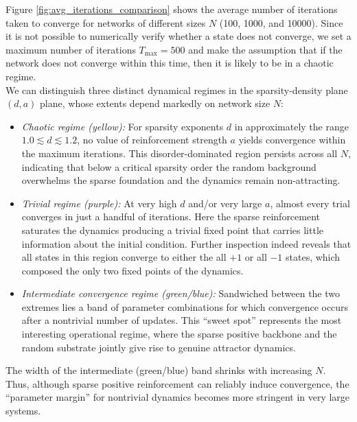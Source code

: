 \documentclass[a4paper,12pt]{report}
\begin{document}
Figure \ref{fig:avg_iterations_comparison} shows the average number of iterations
taken to converge for networks of different sizes \(N\) (100, 1000, and 10000).
Since it is not possible to numerically verify whether a state does not
converge, we set a maximum number of iterations \(T_{\max} = 500\) and 
make the assumption that if the network does not converge within this time,
then it is likely to be in a chaotic regime. \\
We can distinguish three distinct dynamical regimes in the sparsity-density
plane \((d,a)\) plane, whose extents depend markedly on network size \(N\):

\begin{itemize}
  \item \emph{Chaotic regime (yellow):}  
    For sparsity exponents \(d\) in approximately the range 
    \(1.0 \lesssim d \lesssim 1.2\), no value of reinforcement 
    strength \(a\) yields convergence within the maximum iterations.  
    This disorder-dominated region persists across all \(N\), 
    indicating that below a critical sparsity order the random 
    background overwhelms the sparse foundation and the dynamics 
    remain non-attracting.

  \item \emph{Trivial regime (purple):}  
    At very high \(d\) and/or very large \(a\), almost every trial 
    converges in just a handful of iterations.  Here the sparse 
    reinforcement saturates the dynamics producing a trivial fixed 
    point that carries little information about the initial condition. 
    Further inspection indeed reveals that all states in this region 
    converge to either the all \(+1\) or all \(-1\) states, which 
    composed the only two fixed points of the dynamics.

  \item \emph{Intermediate convergence regime (green/blue):}  
    Sandwiched between the two extremes lies a band of parameter 
    combinations for which convergence occurs after a nontrivial 
    number of updates. This ``sweet spot'' represents the most 
    interesting operational regime, where the sparse positive backbone 
    and the random substrate jointly give rise to genuine attractor 
    dynamics.

\end{itemize}

The width of the intermediate (green/blue) band shrinks with 
increasing \(N\). Thus, although sparse positive reinforcement can 
reliably induce convergence, the ``parameter margin'' for nontrivial 
dynamics becomes more stringent in very large systems.
\vspace*{0.5em}
\end{document}
